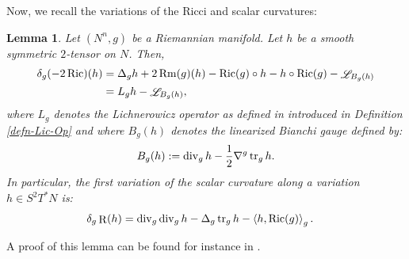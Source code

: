 \documentclass[a4paper,11pt,reqno]{amsart}
\newtheorem{lemma}[defn]{Lemma}
\def\Ric{\mathop{\rm Ric}\nolimits}
\def\Rm{\mathop{\rm Rm}\nolimits}
\def\tr{\mathop{\rm tr}\nolimits}
\def\div{\mathop{\rm div}\nolimits}
\def\Li{\mathop{\rm \mathscr{L}}\nolimits}
\def\Ric{\mathop{\rm Ric}\nolimits}
\def\Rm{\mathop{\rm Rm}\nolimits}
\def\tr{\mathop{\rm tr}\nolimits}
\def\div{\mathop{\rm div}\nolimits}
\def\Li{\mathop{\rm \mathscr{L}}\nolimits}
\def\R{\mathop{\rm R}\nolimits}
\numberwithin{equation}{section}
\begin{document}
	Now, we recall the variations of the Ricci and scalar curvatures:
	\begin{lemma}\label{lem-lin-equ-Ric-first-var}
		Let $(N^n,g)$ be a Riemannian manifold. Let $h$ be a smooth symmetric $2$-tensor on $N$. Then,
		\begin{equation}
		\begin{split}
		\delta_{g}(-2\Ric)(h)&=\Delta_{g}h+2\Rm(g)(h)-\Ric(g)\circ h-h\circ \Ric(g)-\Li_{B_{g}(h)}\\
		&=L_gh-\Li_{B_{g}(h)},
		\end{split}
		\end{equation}
		where $L_g$ denotes the Lichnerowicz operator as defined in introduced in Definition \ref{defn-Lic-Op} and where $B_{g}(h)$ denotes the linearized Bianchi gauge defined by:
		\begin{equation}
		B_{g}(h):=\div_{g}h-\frac{1}{2}\nabla^{g}\tr_{g}h.\label{defn-bianchi-op}
		\end{equation}
		In particular, the first variation of the scalar curvature along a variation $h\in S^2T^*N$ is:
		\begin{equation}
		\begin{split}
		\delta_{g}\R(h)&=\div_{g}\div_{g}h-\Delta_{g}\tr_gh-\left<h,\Ric(g)\right>_g.\label{lem-lin-equ-scal-first-var}
		\end{split}
		\end{equation}
		
	\end{lemma}
	A proof of this lemma can be found for instance in \cite[Chapter $2$]{Cho-Boo}.
	
\end{document}
